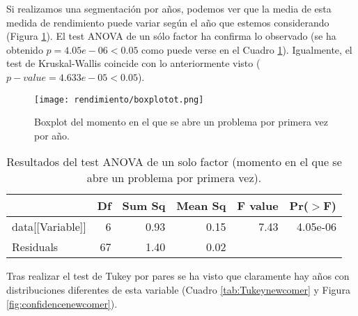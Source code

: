 Si realizamos una segmentación por años, podemos ver que la media de esta medida de rendimiento puede variar según el año que estemos considerando (Figura \ref{fig:boxplotnewcomer}). El test ANOVA de un sólo factor ha confirma lo observado (se ha obtenido $p = 4.05e-06 < 0.05$ como puede verse en el Cuadro \ref{tab:ANOVAnewcomer}). Igualmente, el test de Kruskal-Wallis coincide con lo anteriormente visto ($p-value = 4.633e-05 < 0.05$).

\begin{figure}[H]
    \centering
    \texttt{[image: rendimiento/boxplotot.png]}
    \caption{Boxplot del momento en el que se abre un problema por primera vez por año.}
    \label{fig:boxplotnewcomer}
\end{figure}

\begin{table}[H]
\centering
\caption{Resultados del test ANOVA de un solo factor (momento en el que se abre un problema por primera vez).}
\label{tab:ANOVAnewcomer}
\begin{tabular}{lrrrrr}
  \hline
 & Df & Sum Sq & Mean Sq & F value & Pr($>$F) \\ 
  \hline
data[[Variable]] & 6 & 0.93 & 0.15 & 7.43 & 4.05e-06 \\ 
  Residuals            & 67 & 1.40 & 0.02 &  &  \\ 
   \hline
\end{tabular}
\end{table}

Tras realizar el test de Tukey por pares se ha visto que claramente hay años con distribuciones diferentes de esta variable (Cuadro \ref{tab:Tukeynewcomer} y Figura \ref{fig:confidencenewcomer}).

